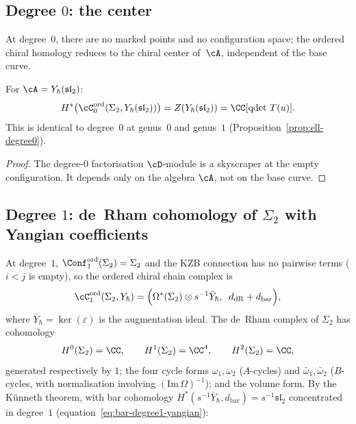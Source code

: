 \subsection{Degree $0$: the center}
\label{subsec:g2-degree0}

At degree~$0$, there are no marked points and no
configuration space; the ordered chiral homology reduces
to the chiral center of~$\cA$, independent of the base
curve.

\begin{proposition}
\label{prop:g2-degree0}
For $\cA = Y_\hbar(\mathfrak{sl}_2)$:
\begin{equation}\label{eq:g2-degree0}
  H^*\bigl(\cC_0^{\mathrm{ord}}(\Sigma_2,
  Y_\hbar(\mathfrak{sl}_2))\bigr)
  = Z(Y_\hbar(\mathfrak{sl}_2))
  = \CC[\operatorname{qdet}\,T(u)].
\end{equation}
This is identical to degree~$0$ at genus~$0$
and genus~$1$
\textup{(}Proposition~\textup{\ref{prop:ell-degree0}}\textup{)}.
\end{proposition}

\begin{proof}
The degree-$0$ factorisation $\cD$-module is a skyscraper
at the empty configuration. It depends only on the algebra
$\cA$, not on the base curve.
\end{proof}

\subsection{Degree $1$: de~Rham cohomology of
$\Sigma_2$ with Yangian coefficients}
\label{subsec:g2-degree1}

At degree~$1$,
$\Conf_1^{\mathrm{ord}}(\Sigma_2) = \Sigma_2$ and the KZB
connection has no pairwise terms ($i < j$ is empty), so the
ordered chiral chain complex is
\begin{equation}\label{eq:g2-degree1-cx}
  \cC_1^{\mathrm{ord}}(\Sigma_2, Y_\hbar)
  = \Bigl(\Omega^*(\Sigma_2) \otimes s^{-1}\bar{Y}_\hbar,
  \;\; d_{\mathrm{dR}} + d_{\mathrm{bar}}\Bigr),
\end{equation}
where $\bar{Y}_\hbar = \ker(\varepsilon)$ is the
augmentation ideal.
The de~Rham complex of $\Sigma_2$ has cohomology
\begin{equation}\label{eq:dr-sigma2}
  H^0(\Sigma_2) = \CC, \qquad
  H^1(\Sigma_2) = \CC^4, \qquad
  H^2(\Sigma_2) = \CC,
\end{equation}
generated respectively by $1$; the four cycle forms
$\omega_1, \omega_2$ ($A$-cycles) and
$\bar{\omega}_1, \bar{\omega}_2$ ($B$-cycles, with
normalisation involving
$(\mathrm{Im}\,\Omega)^{-1}$); and the volume form.
By the K\"unneth theorem, with bar cohomology
$H^*(s^{-1}\bar{Y}_\hbar, d_{\mathrm{bar}}) =
s^{-1}\mathfrak{sl}_2$ concentrated in degree~$1$
(equation~\eqref{eq:bar-degree1-yangian}):

